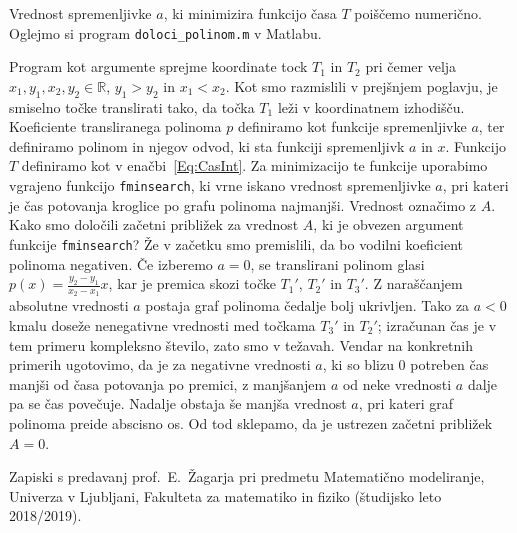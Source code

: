 \documentclass[a4paper]{article}
\begin{document}
Vrednost spremenljivke $a$, ki minimizira funkcijo časa $T$ poiščemo numerično. Oglejmo si program \texttt{doloci\_polinom.m} v Matlabu.

Program kot argumente sprejme koordinate tock $T_1$ in $T_2$ pri čemer velja $x_1, y_1, x_2, y_2 \in \mathbb{R}$, $y_1 > y_2$ in $x_1 < x_2$. Kot smo razmislili v prejšnjem poglavju, je smiselno točke translirati tako, da točka $T_1$ leži v koordinatnem izhodišču. Koeficiente transliranega polinoma $p$ definiramo kot funkcije spremenljivke $a$, ter definiramo polinom in njegov odvod, ki sta funkciji spremenljivk $a$ in $x$. Funkcijo $T$ definiramo kot v enačbi~\eqref{Eq:CasInt}. Za minimizacijo te funkcije uporabimo vgrajeno funkcijo \texttt{fminsearch}, ki vrne iskano vrednost spremenljivke $a$, pri kateri je čas potovanja kroglice po grafu polinoma najmanjši. Vrednost označimo z $A$.
Kako smo določili začetni približek za vrednost $A$, ki je obvezen argument funkcije \texttt{fminsearch}? Že v začetku smo premislili, da bo vodilni koeficient polinoma negativen. Če izberemo $a=0$, se translirani polinom glasi $p(x) = \frac{y_2-y_1}{x_2-x_1} x$, kar je premica skozi točke $T_{1}'$, $T_{2}'$ in $T_{3}'$. Z naraščanjem absolutne vrednosti $a$ postaja graf polinoma čedalje bolj ukrivljen. Tako za $a<0$ kmalu doseže nenegativne vrednosti med točkama $T_{3}'$ in $T_{2}'$; izračunan čas je v tem primeru kompleksno število, zato smo v težavah. Vendar na konkretnih primerih ugotovimo, da je za negativne vrednosti $a$, ki so blizu $0$ potreben čas manjši od časa potovanja po premici, z manjšanjem $a$ od neke vrednosti $a$ dalje pa se čas povečuje. Nadalje obstaja še manjša vrednost $a$, pri kateri graf polinoma preide abscisno os. Od tod sklepamo, da je ustrezen začetni približek $A=0$.


\begin{thebibliography}{99}

 Zapiski s predavanj prof.~E.~Žagarja pri predmetu Matematično modeliranje, Univerza v Ljubljani, Fakulteta za matematiko in fiziko (študijsko leto 2018/2019).

\end{thebibliography}
\end{document}
